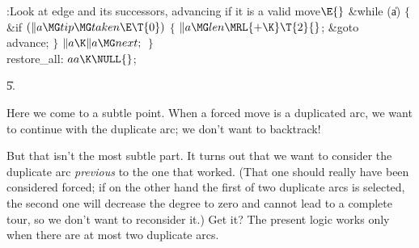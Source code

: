 \B{}:Look at edge  and its successors, advancing if
it is a valid move\X${}\E{}$\6
\&{while} (\|a)\5
${}\{{}$\1\6
\&{if} ${}(\|a\MG\\{tip}\MG\\{taken}\E\T{0}){}$\5
${}\{{}$\1\6
${}\|a\MG\\{len}\MRL{+{\K}}\T{2}{}$;\6
\&{goto} \\{advance};\6
\4${}\}{}$\2\6
${}\|a\K\|a\MG\\{next};{}$\6
\4${}\}{}$\2\6
\4\\{restore\_all}:\5
${}\\{aa}\K\NULL{}$;%
\par
\U5.\fi

Here we come to a subtle point. When a forced move is a
duplicated arc,
we want to continue with the duplicate arc; we don't want to backtrack!

But that isn't the most subtle part. It turns out that we want to
consider the duplicate arc {\it previous\/} to the one that worked.
(That one should really have been considered forced; if on the other
hand the first of two duplicate arcs is selected, the second one will
decrease the degree to zero and cannot lead to a complete tour, so
we don't want to reconsider it.) Get it? The present logic works
only when there are at most two duplicate arcs.

